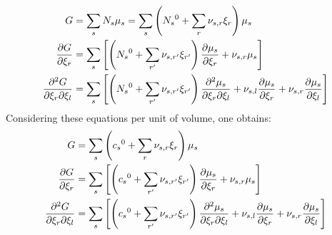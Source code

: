 \begin{equation}
\begin{split}
\Gibbs & = \sum_s\Mol[s]\chempot[s]
         = \sum_s\left(\Mol[s]^0 + \sum_r\scoef[s,r]\ext[r]\right)\chempot[s] \\
\doverdext[r]{\Gibbs} & = \sum_s \left[\left(\Mol[s]^0 + \sum_{r'}\scoef[s,r']\ext[r']\right)\doverdext[r]{\chempot[s]}
                                + \scoef[s,r]\chempot[s]\right] \\
\ddoverddext{\Gibbs}{r}{l} & = \sum_s \left[\left(\Mol[s]^0 + \sum_{r'}\scoef[s,r']\ext[r']\right)\ddoverddext{\chempot[s]}{r}{l}
                                        + \scoef[s,l]\doverdext[r]{\chempot[s]}
                                        + \scoef[s,r]\doverdext[l]{\chempot[s]}\right] \\
\end{split}
\end{equation}
Considering these equations per unit of volume, one obtains:
\begin{equation}
\begin{split}
\Gibbs & = \sum_s\left(\molar[s]^0 + \sum_r\scoef[s,r]\ext[r]\right)\chempot[s] \\
\doverdext[r]{\Gibbs} & = \sum_s \left[\left(\molar[s]^0 + \sum_{r'}\scoef[s,r']\ext[r']\right)\doverdext[r]{\chempot[s]}
                                + \scoef[s,r]\chempot[s]\right] \\
\ddoverddext{\Gibbs}{r}{l} & = \sum_s \left[\left(\molar[s]^0 + \sum_{r'}\scoef[s,r']\ext[r']\right)\ddoverddext{\chempot[s]}{r}{l}
                                        + \scoef[s,l]\doverdext[r]{\chempot[s]}
                                        + \scoef[s,r]\doverdext[l]{\chempot[s]}\right] \\
\end{split}
\end{equation}

